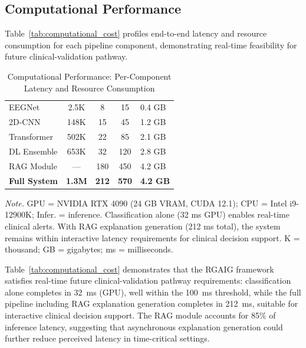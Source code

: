 \subsection{Computational Performance}

\iffalse %
Table~\ref{tab:computational_cost} profiles end-to-end latency and resource consumption for each pipeline component, demonstrating real-time feasibility for future clinical-validation pathway.

\begin{table}[!htbp]
\tablestripes\tablefontsize
\caption[Computational Performance]{Computational Performance: Per-Component Latency and Resource Consumption}
\tablefontsize
\begin{tabularx}{\textwidth}{@{} >{\raggedright\arraybackslash}p{2.5cm} C C C L @{}}
\toprule
{} &  &  &  &  \\
\midrule
EEGNet & 2.5K & 8 & 15 & 0.4 GB \\
\addlinespace
2D-CNN & 148K & 15 & 45 & 1.2 GB \\
\addlinespace
Transformer & 502K & 22 & 85 & 2.1 GB \\
\addlinespace
DL Ensemble & 653K & 32 & 120 & 2.8 GB \\
\addlinespace
RAG Module & --- & 180 & 450 & 4.2 GB \\
\addlinespace
\textbf{Full System} & \textbf{1.3M} & \textbf{212} & \textbf{570} & \textbf{4.2 GB} \\
\bottomrule
\end{tabularx}
\vspace{0.5em}\noindent\textit{Note.} GPU = NVIDIA RTX 4090 (24 GB VRAM, CUDA 12.1); CPU = Intel i9-12900K; Infer. = inference. Classification alone (32 ms GPU) enables real-time clinical alerts. With RAG explanation generation (212 ms total), the system remains within interactive latency requirements for clinical decision support. K = thousand; GB = gigabytes; ms = milliseconds.
\end{table}

\noindent Table~\ref{tab:computational_cost} demonstrates that the RGAIG framework satisfies real-time future clinical-validation pathway requirements: classification alone completes in 32~ms (GPU), well within the 100~ms threshold, while the full pipeline including RAG explanation generation completes in 212~ms, suitable for interactive clinical decision support. The RAG module accounts for 85\% of inference latency, suggesting that asynchronous explanation generation could further reduce perceived latency in time-critical settings.

